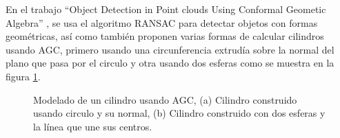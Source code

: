         En el trabajo “Object Detection in Point clouds Using Conformal Geometic Algebra” \cite{cilindrosAGC}, se usa el algoritmo RANSAC para detectar objetos con formas geométricas, así como también proponen varias formas de calcular cilindros usando AGC, primero usando una circunferencia extrudía sobre la normal del plano que pasa por el circulo y otra usando dos esferas como se muestra en la figura \ref{fig:05Antecedentes}.\\
        
        \begin{figure}[!htb] 
        	\centering
        	\caption[Modelado de un cilindro usando AGC.]{Modelado de un cilindro usando AGC, (a) Cilindro construido usando circulo y su normal, (b) Cilindro construido con dos esferas y la línea que une sus centros.} 
        	\label{fig:05Antecedentes}
        \end{figure}
        
        
    
